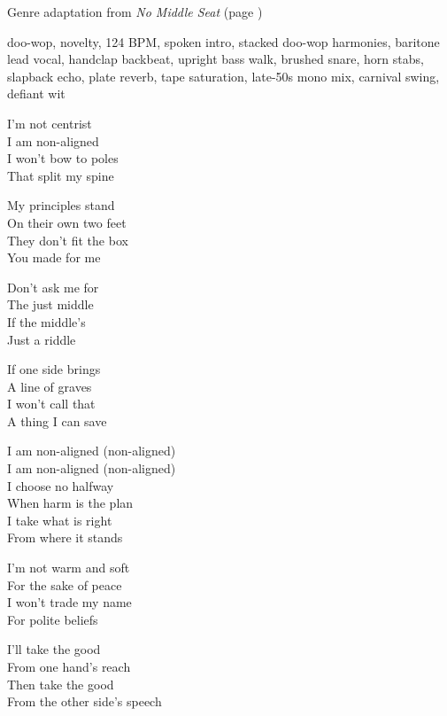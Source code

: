 
\begin{notes}
Genre adaptation from \emph{No Middle Seat} (page \pageref{sec:no-middle-seat})
\end{notes}
\begin{style}
doo-wop, novelty, 124 BPM, spoken intro, stacked doo-wop harmonies, baritone lead vocal, handclap backbeat, upright bass walk, brushed snare, horn stabs, slapback echo, plate reverb, tape saturation, late-50s mono mix, carnival swing, defiant wit
\end{style}
\begin{lyrics}
I’m not centrist\\
I am non-aligned\\
I won’t bow to poles\\
That split my spine

My principles stand\\
On their own two feet\\
They don’t fit the box\\
You made for me

Don’t ask me for\\
The just middle\\
If the middle’s\\
Just a riddle

If one side brings\\
A line of graves\\
I won’t call that\\
A thing I can save

I am non-aligned (non-aligned)\\
I am non-aligned (non-aligned)\\
I choose no halfway\\
When harm is the plan\\
I take what is right\\
From where it stands

I’m not warm and soft\\
For the sake of peace\\
I won’t trade my name\\
For polite beliefs

I’ll take the good\\
From one hand’s reach\\
Then take the good\\
From the other side’s speech


\end{lyrics}
